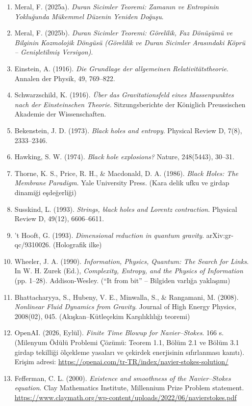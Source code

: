 \documentclass[12pt,a4paper]{article}
\begin{document}
\begin{enumerate}
    \item Meral, F. (2025a). \textit{Duran Sicimler Teoremi: Zamanın ve Entropinin Yokluğunda Mükemmel Düzenin Yeniden Doğuşu}.
    \item Meral, F. (2025b). \textit{Duran Sicimler Teoremi: Görelilik, Faz Dönüşümü ve Bilginin Kozmolojik Döngüsü (Görelilik ve Duran Sicimler Arasındaki Köprü – Genişletilmiş Versiyon)}.
    \item Einstein, A. (1916). \textit{Die Grundlage der allgemeinen Relativitätstheorie}. Annalen der Physik, 49, 769–822.
    \item Schwarzschild, K. (1916). \textit{Über das Gravitationsfeld eines Massenpunktes nach der Einsteinschen Theorie}. Sitzungsberichte der Königlich Preussischen Akademie der Wissenschaften.
    \item Bekenstein, J. D. (1973). \textit{Black holes and entropy}. Physical Review D, 7(8), 2333–2346.
    \item Hawking, S. W. (1974). \textit{Black hole explosions?} Nature, 248(5443), 30–31.
    \item Thorne, K. S., Price, R. H., \& Macdonald, D. A. (1986). \textit{Black Holes: The Membrane Paradigm}. Yale University Press. (Kara delik ufku ve girdap dinamiği eşdeğerliği)
    \item Susskind, L. (1993). \textit{Strings, black holes and Lorentz contraction}. Physical Review D, 49(12), 6606–6611.
    \item ’t Hooft, G. (1993). \textit{Dimensional reduction in quantum gravity}. arXiv:gr-qc/9310026. (Holografik ilke)
    \item Wheeler, J. A. (1990). \textit{Information, Physics, Quantum: The Search for Links}. In W. H. Zurek (Ed.), \textit{Complexity, Entropy, and the Physics of Information} (pp. 1–28). Addison-Wesley. (``It from bit'' – Bilgiden varlığa yaklaşımı)
    \item Bhattacharyya, S., Hubeny, V. E., Minwalla, S., \& Rangamani, M. (2008). \textit{Nonlinear Fluid Dynamics from Gravity}. Journal of High Energy Physics, 2008(02), 045. (Akışkan--Kütleçekim Karşılıklılığı teoremi)
    \item OpenAI. (2026, Eylül). \textit{Finite Time Blowup for Navier--Stokes}. 166 s. (Milenyum Ödülü Problemi Çözümü: Teorem 1.1, Bölüm 2.1 ve Bölüm 3.1 girdap tekilliği ölçekleme yasaları ve çekirdek enerjisinin sıfırlanması kanıtı). Erişim adresi: \url{https://openai.com/tr-TR/index/navier-stokes-solution/}
    \item Fefferman, C. L. (2000). \textit{Existence and smoothness of the Navier--Stokes equation}. Clay Mathematics Institute, Millennium Prize Problem statement. \url{https://www.claymath.org/wp-content/uploads/2022/06/navierstokes.pdf}

\end{enumerate}
\end{document}

